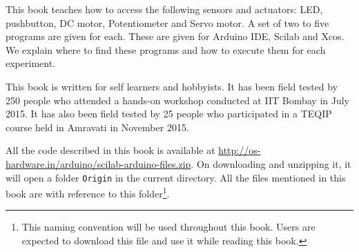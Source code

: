 This book teaches how to access the following sensors and actuators:
LED, pushbutton, DC motor, Potentiometer and Servo motor.  A set of
two to five programs are given for each.  These are given for Arduino
IDE, Scilab and Xcos.  We explain where to find these programs and how
to execute them for each experiment.

This book is written for self learners and hobbyists.  It has been
field tested by 250 people who attended a hands-on workshop conducted
at IIT Bombay in July 2015.  It has also been field tested by 25
people who participated in a TEQIP course held in Amravati in November
2015.  

All the code described in this book is available at
\url{http://os-hardware.in/arduino/scilab-arduino-files.zip}.  On
downloading and unzipping it, it will open a folder {\tt Origin} in
the current directory.  All the files mentioned in this book are
with reference to this folder\footnote{\label{fn:file-loc}This naming
  convention will be used throughout this book.  Users are expected to
  download this file and use it while reading this book.}.
